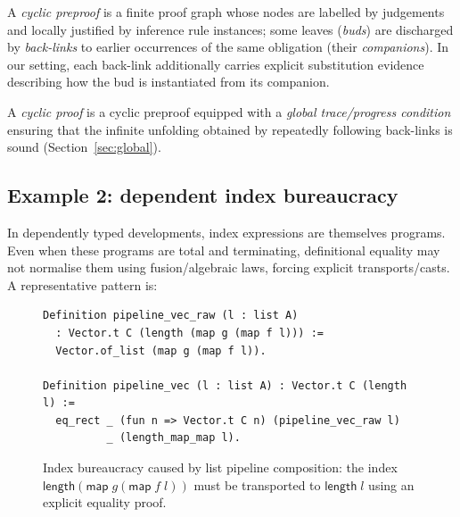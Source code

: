 \begin{definition}
A \emph{cyclic preproof} is a finite proof graph whose nodes are labelled by judgements and locally justified by inference rule instances; some leaves (\emph{buds}) are discharged by \emph{back-links} to earlier occurrences of the same obligation (their \emph{companions}).
In our setting, each back-link additionally carries explicit substitution evidence describing how the bud is instantiated from its companion.

A \emph{cyclic proof} is a cyclic preproof equipped with a \emph{global trace/progress condition} ensuring that the infinite unfolding obtained by repeatedly following back-links is sound (Section~\ref{sec:global}).
\end{definition}

\subsection{Example 2: dependent index bureaucracy}

In dependently typed developments, index expressions are themselves programs.
Even when these programs are total and terminating, definitional equality may not normalise them using fusion/algebraic laws, forcing explicit transports/casts.
A representative pattern is:

\begin{figure}[t]
\centering
\begingroup\footnotesize\ttfamily
\begin{verbatim}
Definition pipeline_vec_raw (l : list A)
  : Vector.t C (length (map g (map f l))) :=
  Vector.of_list (map g (map f l)).

Definition pipeline_vec (l : list A) : Vector.t C (length l) :=
  eq_rect _ (fun n => Vector.t C n) (pipeline_vec_raw l)
          _ (length_map_map l).
\end{verbatim}
\endgroup
\caption{Index bureaucracy caused by list pipeline composition: the index \(\mathsf{length}(\mathsf{map}\;g(\mathsf{map}\;f\;l))\) must be transported to \(\mathsf{length}\;l\) using an explicit equality proof.}
\label{fig:mapmap-index-pain}
\end{figure}

